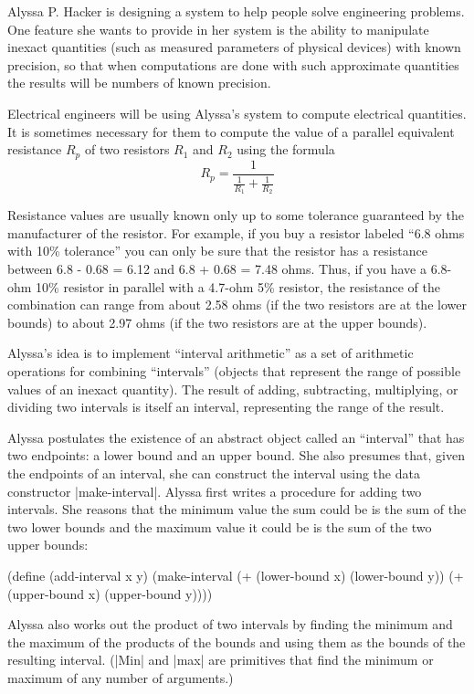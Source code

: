 \begin{Exercise}
Alyssa P. Hacker is designing a system to help people solve
engineering problems.  One feature she wants to provide in her system
is the ability to manipulate inexact quantities (such as measured
parameters of physical devices) with known precision, so that when
computations are done with such approximate quantities the results
will be numbers of known precision.

Electrical engineers will be using Alyssa's system to compute
electrical quantities.  It is sometimes necessary for them to compute
the value of a parallel equivalent resistance $R_p$ of two resistors
$R_1$ and $R_2$ using the formula \[ R_p = \frac{1}{\frac{1}{R_1} + \frac{1}{R_2}} \]

Resistance values are usually known only up to some tolerance
guaranteed by the manufacturer of the resistor.  For example, if you
buy a resistor labeled ``6.8 ohms with 10\% tolerance'' you can only
be sure that the resistor has a resistance between 6.8 - 0.68 = 6.12 and
6.8 + 0.68 = 7.48 ohms.  Thus, if you have a 6.8-ohm 10\% resistor in
parallel with a 4.7-ohm 5\% resistor, the resistance of the
combination can range from about 2.58 ohms (if the two resistors are
at the lower bounds) to about 2.97 ohms (if the two resistors are at
the upper bounds).

Alyssa's idea is to implement ``interval arithmetic'' as a set of
arithmetic operations for combining ``intervals'' (objects
that represent the range of possible values of an inexact quantity).
The result of adding, subtracting, multiplying, or dividing two
intervals is itself an interval, representing the range of the
result.

Alyssa postulates the existence of an abstract object called an
``interval'' that has two endpoints: a lower bound and an upper bound.
She also presumes that, given the endpoints of an interval, she can
construct the interval using the data constructor \scheme|make-interval|.
Alyssa first writes a procedure for adding two intervals.  She
reasons that the minimum value the sum could be is the sum of the two
lower bounds and the maximum value it could be is the sum of the two
upper bounds:

\begin{schemedisplay}
(define (add-interval x y)
  (make-interval (+ (lower-bound x) (lower-bound y))
                 (+ (upper-bound x) (upper-bound y))))
\end{schemedisplay}
Alyssa also works out the product of two intervals by finding the
minimum and the maximum of the products of the bounds and using them
as the bounds of the resulting interval.  (\scheme|Min| and \scheme|max| are
primitives that find the minimum or maximum of any number of
arguments.)


\end{Exercise}
